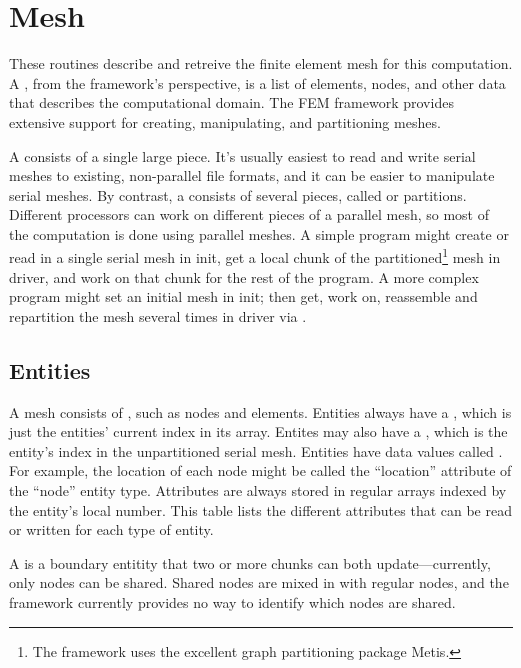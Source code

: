 \section{Mesh}

These routines describe and retreive the finite element mesh for this
computation.  A , from the framework's perspective, is a list of
elements, nodes, and other data that describes the computational domain.
The FEM framework provides extensive support for creating, manipulating,
and partitioning meshes. 

A  consists of a single large piece.  It's usually
easiest to read and write serial meshes to existing, non-parallel file formats,
and it can be easier to manipulate serial meshes.  By contrast, a 
 consists
of several pieces, called  or partitions.  Different processors
can work on different pieces of a parallel mesh, so most of the computation
is done using parallel meshes.  A simple program might create or read in a
single serial mesh in init, get a local chunk of the 
partitioned\footnote{The framework uses the excellent graph partitioning
package Metis.}
mesh in driver, and work on that chunk for the rest of the program.  
A more complex program might set an initial mesh in init; then get, 
work on, reassemble and repartition the mesh several times in driver 
via .

\subsection{Entities}
A mesh consists of , such as nodes and elements.
Entities always have a , which is just the entities'
current index in its array.  Entites may also have a , 
which is the entity's index in the unpartitioned serial mesh.
Entities have data values called .
For example, the location of each node might be called the 
``location'' attribute of the ``node'' entity type.  Attributes are
always stored in regular arrays indexed by the entity's local number.
This table lists the different attributes that can be read or
written for each type of entity.

A  is a boundary entitity that two or more chunks 
can both update---currently, only nodes can be shared.  Shared nodes
are mixed in with regular nodes, and the framework currently provides
no way to identify which nodes are shared.


